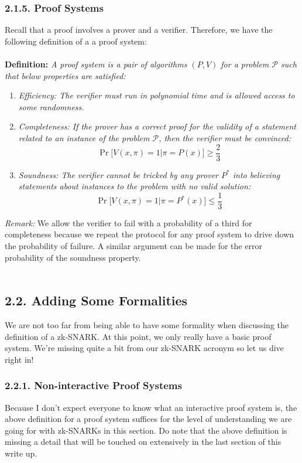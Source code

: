 \documentclass{article}
\begin{document}
\subsubsection*{2.1.5. Proof Systems}
Recall that a proof involves a prover and a verifier. Therefore, we have the following definition of a a proof system: \\ \\
\textbf{Definition:} \textit{A proof system is a pair of algorithms $(P, V)$ for a problem $\mathcal{P}$ such that below properties are satisfied:}
    \begin{enumerate}
        \item \textit{Efficiency: The verifier must run in polynomial time and is allowed access to some randomness.}
        \item \textit{Completeness: If the prover has a correct proof for the validity of a statement related to an instance of the problem $\mathcal{P}$, then the verifier must be convinced:}
        $$\Pr\bigg[V(x, \pi) = 1 \Bigg\vert \pi = P(x)\bigg] \geq \frac{2}{3}$$
        \item \textit{Soundness: The verifier cannot be tricked by any prover $P^*$ into believing statements about instances to the problem with no valid solution:}
        $$\Pr\bigg[V(x, \pi) = 1 \Bigg\vert \pi = P^*(x)\bigg] \leq \frac{1}{3}$$
    \end{enumerate}
\noindent \textit{Remark:} We allow the verifier to fail with a probability of a third for completeness because we repeat the protocol for any proof system to drive down the probability of failure. A similar argument can be made for the error probability of the soundness property. \\ \\
\subsection*{2.2. Adding Some Formalities}
We are not too far from being able to have some formality when discussing the definition of a zk-SNARK. At this point, we only really have a basic proof system. We're missing quite a bit from our zk-SNARK acronym so let us dive right in!
\subsubsection*{2.2.1. Non-interactive Proof Systems}
Because I don't expect everyone to know what an interactive proof system is, the above definition for a proof system suffices for the level of understanding we are going for with zk-SNARKs in this section. Do note that the above definition is missing a detail that will be touched on extensively in the last section of this write up.
\end{document}
